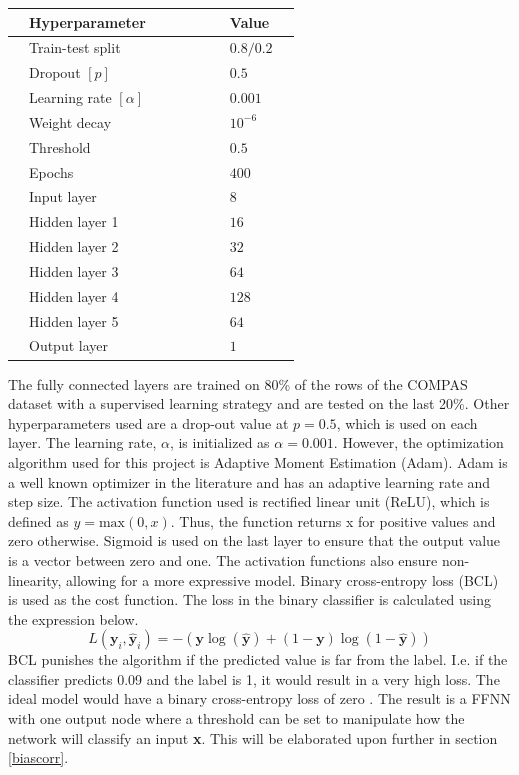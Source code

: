 \documentclass[11pt, fleqn, titlepage]{article}
\begin{document}
	\begin{table}[H]
		\centering
		\begin{tabular}{l l l l l l l l l}
			\toprule
			& \textbf{Hyperparameter}           &&&&& & \textbf{Value}    & \\ \midrule
			& Train-test split         &&&&& & $0.8/0.2$& \\
			& Dropout $[p]$            &&&&& & $0.5$    & \\ 
			& Learning rate $[\alpha]$ &&&&& & $0.001$  & \\ 
			& Weight decay             &&&&& & $10^{-6}$& \\ 
			& Threshold                &&&&& & $0.5$    & \\ 
			& Epochs                   &&&&& & $400$    & \\ 
			& Input layer              &&&&& & $8$      & \\ 
			& Hidden layer 1           &&&&& & $16$     & \\ 
			& Hidden layer 2           &&&&& & $32$     & \\ 
			& Hidden layer 3           &&&&& & $64$     & \\ 
			& Hidden layer 4           &&&&& & $128$    & \\ 
			& Hidden layer 5           &&&&& & $64$     & \\ 
			& Output layer             &&&&& & $1$      & \\ \bottomrule
		\end{tabular}
	\end{table}
	\noindent
	The fully connected layers are trained on 80\% of the rows of the COMPAS dataset with a supervised learning strategy and are tested on the last 20\%. Other hyperparameters used are a drop-out value at $p=0.5$, which is used on each layer. The learning rate, $\alpha$, is initialized as $\alpha = 0.001$. However, the optimization algorithm used for this project is Adaptive Moment Estimation (Adam). Adam is a well known optimizer in the literature and has an adaptive learning rate and step size. The activation function used is rectified linear unit (ReLU), which is defined as $ y = \text{max}(0,x) $. Thus, the function returns x for positive values and zero otherwise. Sigmoid is used on the last layer to ensure that the output value is a vector between zero and one. The activation functions also ensure non-linearity, allowing for a more expressive model. Binary cross-entropy loss (BCL) is used as the cost function. The loss in the binary classifier is calculated using the expression below. 
	\begin{equation}\label{key}
	L\left(\boldsymbol{y}_{i}, \hat{\boldsymbol{y}}_{i}\right) = -(\mathbf y \log (\mathbf {\hat y})+(1-\mathbf  y) \log (1-\mathbf {\hat y}))
	\end{equation}
	BCL punishes the algorithm if the predicted value is far from the label. I.e. if the classifier predicts 0.09 and the label is 1, it would result in a very high loss. The ideal model would have a binary cross-entropy loss of zero \cite {dl}. The result is a FFNN with one output node where a threshold can be set to manipulate how the network will classify an input \textbf{x}. This will be elaborated upon further in section \ref{biascorr}.
\end{document}
